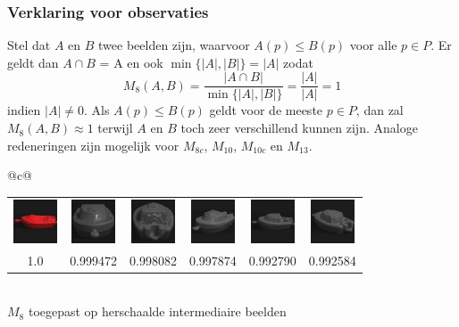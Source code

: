 \documentclass[dutch]{beamer}
\theoremstyle{definition}
\theoremstyle{remark}
\theoremstyle{example}
\begin{document}
\frame
{
  \frametitle{Verklaring voor observaties}
  
  Stel dat $A$ en $B$
  twee beelden zijn, waarvoor $A(p) \le B(p)$ voor alle
  $p \in P$. Er geldt dan $A \cap B$ = A en ook $\min\{|A|,|B|\}=|A|$ zodat
  \begin{displaymath}
  M_8(A,B)= \frac{|A \cap B|}{\min\{|A|,|B|\}} = \frac{|A|}{|A|} = 1
  \end{displaymath}
  indien $|A| \ne 0$. Als $A(p) \le B(p)$ geldt voor de meeste $p \in P$, dan 
  zal $M_8(A,B) \approx 1$ terwijl $A$ en $B$ toch 
  zeer verschillend kunnen zijn. Analoge redeneringen zijn mogelijk voor
  $M_{8c}$, $M_{10}$, $M_{10c}$ en $M_{13}$.
  
  \begin{center}
  \begin{tabular}{@{}c@{}}
  \begin{minipage}{\textwidth}
  \vspace{6pt}
  \centering
  \begin{tabular}{cccccc}
  \includegraphics[width=1.3cm]{coil/beeld-18.eps} &
  \includegraphics[width=1.3cm]{coil/beeld-26.eps} &
  \includegraphics[width=1.3cm]{coil/beeld-29.eps} &
  \includegraphics[width=1.3cm]{coil/beeld-27.eps} &
  \includegraphics[width=1.3cm]{coil/beeld-24.eps} &
  \includegraphics[width=1.3cm]{coil/beeld-28.eps} \\
  {\scriptsize 1.0} & 
  {\scriptsize 0.999472} & 
  {\scriptsize 0.998082} & 
  {\scriptsize 0.997874} & 
  {\scriptsize 0.992790} &
  {\scriptsize 0.992584} 
  \end{tabular}
  \end{minipage} \\
  {\scriptsize $M_8$ toegepast op herschaalde intermediaire beelden}
  \end{tabular}
  \end{center}
}
\end{document}

